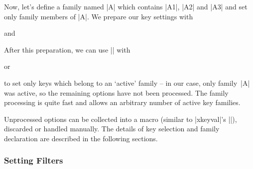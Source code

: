 Now, let's define a family named |A| which contains |A1|, |A2| and |A3| and set
only family members of |A|. We prepare our key settings with
%
\begin{codeexample}
\end{codeexample}
%
\noindent and
%
\begin{codeexample}
\end{codeexample}
%
\noindent After this preparation, we can use |\pgfkeysfiltered| with
%
\begin{codeexample}[]
\end{codeexample}
%
\noindent or
%
\begin{codeexample}[]
\end{codeexample}
%
\noindent to set only keys which belong to an `active' family -- in our case,
only family~|A| was active, so the remaining options have not been processed.
The family processing is quite fast and allows an arbitrary number of active
key families.

Unprocessed options can be collected into a macro (similar to |xkeyval|'s
|\xkv@rm|), discarded or handled manually. The details of key selection and
family declaration are described in the following sections.


\subsubsection{Setting Filters}


